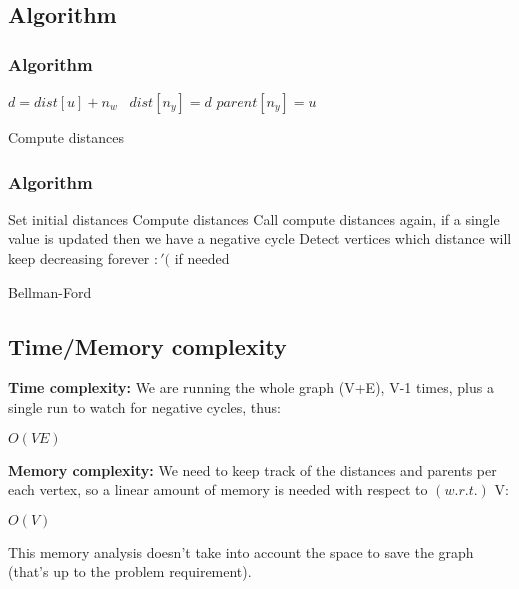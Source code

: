 \documentclass[article]{beamer}
\begin{document}
\subsection{Algorithm}
\begin{frame}
	\frametitle{Algorithm}
	
		\begin{algorithm}[H]
		\begin{algorithmic}[1]
		\STATE $d = dist[u] + n_{w}$\
		\STATE $dist[n_{y}] = d$
		\STATE $parent[n_{y}] = u$
		\ENDIF
		\ENDFOR
		\ENDFOR
		\ENDFOR
		
		\end{algorithmic}
		\caption{Compute distances}
		\label{alg:seq}
		\end{algorithm}	
	
\end{frame}

\begin{frame}
	\frametitle{Algorithm}
	
		\begin{algorithm}[H]
		\begin{algorithmic}[1]
		\STATE Set initial distances
		\STATE Compute distances
		\STATE Call compute distances again, if a single value is updated then we have a negative cycle	
		\STATE Detect vertices which distance will keep decreasing forever $:'($ if needed	
		\end{algorithmic}
		\caption{Bellman-Ford}
		\label{alg:seq}
		\end{algorithm}	

\end{frame}

\subsection{Time/Memory complexity}
\begin{frame}
\textbf{Time complexity:} We are running the whole graph (V+E), V-1 times, plus a single run to watch for negative cycles, thus:

\vspace{5mm}

\begin{center} \textbf{$O(VE)$} \end{center}

\vspace{8mm}

\textbf{Memory complexity:} We need to keep track of the distances and parents per each vertex, so a linear amount of memory is needed with respect to $(w.r.t.)$ V:

\vspace{5mm}

\begin{center} \textbf{$O(V)$} \end{center}

\vspace{5mm}

This memory analysis doesn't take into account the space to save the graph (that's up to the problem requirement).
\end{frame}
\end{document}

